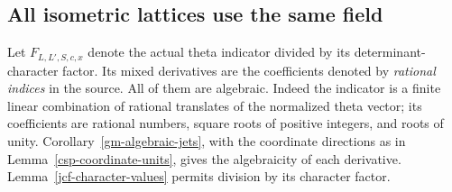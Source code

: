 \subsection{All isometric lattices use the same field}

Let $F_{L,L',S,c,x}$ denote the actual theta indicator divided
by its determinant-character factor. Its mixed derivatives
are the coefficients denoted by \emph{rational indices} in
the source. All of them are algebraic. Indeed the indicator
is a finite linear combination of rational translates of
the normalized theta vector; its coefficients are rational
numbers, square roots of positive integers, and roots of
unity. Corollary~\ref{gm-algebraic-jets}, with the coordinate
directions as in Lemma~\ref{csp-coordinate-units}, gives the
algebraicity of each derivative. Lemma~\ref{jcf-character-values}
permits division by its character factor.

